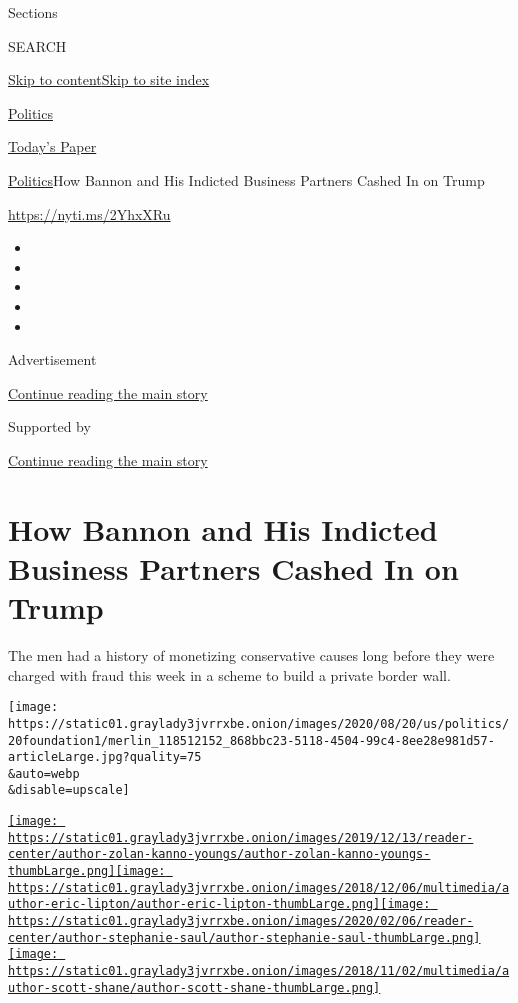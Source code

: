 Sections

SEARCH

\protect\hyperlink{site-content}{Skip to
content}\protect\hyperlink{site-index}{Skip to site index}

\href{https://www.nytimes3xbfgragh.onion/section/politics}{Politics}

\href{https://myaccount.nytimes3xbfgragh.onion/auth/login?response_type=cookie\&client_id=vi}{}

\href{https://www.nytimes3xbfgragh.onion/section/todayspaper}{Today's
Paper}

\href{/section/politics}{Politics}\textbar{}How Bannon and His Indicted
Business Partners Cashed In on Trump

\url{https://nyti.ms/2YhxXRu}

\begin{itemize}
\item
\item
\item
\item
\item
\end{itemize}

Advertisement

\protect\hyperlink{after-top}{Continue reading the main story}

Supported by

\protect\hyperlink{after-sponsor}{Continue reading the main story}

\hypertarget{how-bannon-and-his-indicted-business-partners-cashed-in-on-trump}{%
\section{How Bannon and His Indicted Business Partners Cashed In on
Trump}\label{how-bannon-and-his-indicted-business-partners-cashed-in-on-trump}}

The men had a history of monetizing conservative causes long before they
were charged with fraud this week in a scheme to build a private border
wall.

\texttt{[image: https://static01.graylady3jvrrxbe.onion/images/2020/08/20/us/politics/20foundation1/merlin\_118512152\_868bbc23-5118-4504-99c4-8ee28e981d57-articleLarge.jpg?quality=75\\\&auto=webp\\\&disable=upscale]}

\href{https://www.nytimes3xbfgragh.onion/by/zolan-kanno-youngs}{\texttt{[image: https://static01.graylady3jvrrxbe.onion/images/2019/12/13/reader-center/author-zolan-kanno-youngs/author-zolan-kanno-youngs-thumbLarge.png]}}\href{https://www.nytimes3xbfgragh.onion/by/eric-lipton}{\texttt{[image: https://static01.graylady3jvrrxbe.onion/images/2018/12/06/multimedia/author-eric-lipton/author-eric-lipton-thumbLarge.png]}}\href{https://www.nytimes3xbfgragh.onion/by/stephanie-saul}{\texttt{[image: https://static01.graylady3jvrrxbe.onion/images/2020/02/06/reader-center/author-stephanie-saul/author-stephanie-saul-thumbLarge.png]}}\href{https://www.nytimes3xbfgragh.onion/by/scott-shane}{\texttt{[image: https://static01.graylady3jvrrxbe.onion/images/2018/11/02/multimedia/author-scott-shane/author-scott-shane-thumbLarge.png]}}

